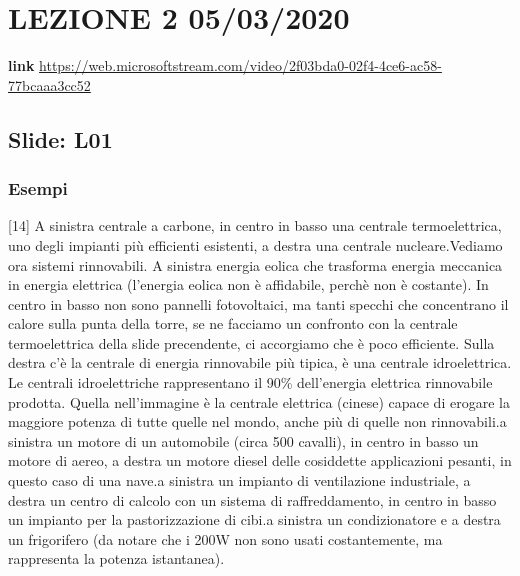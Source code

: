 \section{LEZIONE 2 05/03/2020}
\textbf{link} \url{https://web.microsoftstream.com/video/2f03bda0-02f4-4ce6-ac58-77bcaaa3cc52}
\subsection{Slide: L01}
\subsubsection{Esempi}
[14] A sinistra centrale a carbone, in centro in basso una centrale termoelettrica, uno degli impianti più efficienti esistenti, a destra una centrale nucleare.\newline
[15] Vediamo ora sistemi rinnovabili. A sinistra energia eolica che trasforma energia meccanica in energia elettrica (l'energia eolica non è affidabile, perchè non è costante). In centro in basso non sono pannelli fotovoltaici, ma tanti specchi che concentrano il calore sulla punta della torre, se ne facciamo un confronto con la centrale termoelettrica della slide precendente, ci accorgiamo che è poco efficiente. Sulla destra c'è la centrale di energia rinnovabile più tipica, è una centrale idroelettrica. Le centrali idroelettriche rappresentano il 90\% dell'energia elettrica rinnovabile prodotta. Quella nell'immagine è la centrale elettrica (cinese) capace di erogare la maggiore potenza di tutte quelle nel mondo, anche più di quelle non rinnovabili.\newline
[16] a sinistra un motore di un automobile (circa 500 cavalli), in centro in basso un motore di aereo, a destra un motore diesel delle cosiddette applicazioni pesanti, in questo caso di una nave.\newline
[17] a sinistra un impianto di ventilazione industriale, a destra un centro di calcolo con un sistema di raffreddamento, in centro in basso un impianto per la pastorizzazione di cibi.\newline
[18] a sinistra un condizionatore e a destra un frigorifero (da notare che i 200W non sono usati costantemente, ma rappresenta la potenza istantanea).\newline
